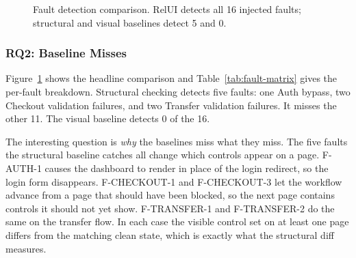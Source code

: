 \documentclass[sigconf,nonacm]{acmart}
\newcommand{\RelUI}{RelUI\xspace}
\begin{document}
\begin{figure}[t]
  \centering
  \caption{Fault detection comparison. \RelUI detects all 16 injected faults; structural and visual baselines detect 5 and 0.}
  \label{fig:detection-bars}
\end{figure}

\subsubsection{RQ2: Baseline Misses}
Figure~\ref{fig:detection-bars} shows the headline comparison and Table~\ref{tab:fault-matrix} gives the per-fault breakdown. Structural checking detects five faults: one Auth bypass, two Checkout validation failures, and two Transfer validation failures. It misses the other 11. The visual baseline detects 0 of the 16.

The interesting question is \emph{why} the baselines miss what they miss. The five faults the structural baseline catches all change which controls appear on a page. F-AUTH-1 causes the dashboard to render in place of the login redirect, so the login form disappears. F-CHECKOUT-1 and F-CHECKOUT-3 let the workflow advance from a page that should have been blocked, so the next page contains controls it should not yet show. F-TRANSFER-1 and F-TRANSFER-2 do the same on the transfer flow. In each case the visible control set on at least one page differs from the matching clean state, which is exactly what the structural diff measures.
\end{document}
